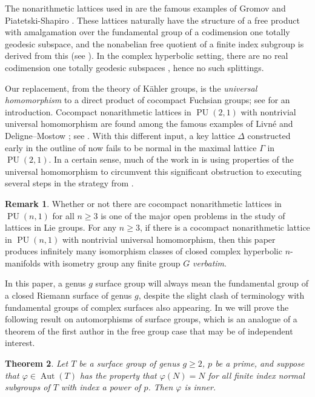 \documentclass[11pt]{article}
\theoremstyle{plain}
\newtheorem{thm}{Theorem}[section]
\theoremstyle{definition}
\newtheorem{rem}[thm]{Remark}
\theoremstyle{remark}
\newcommand{\Gam}{\Gamma}
\newcommand{\Del}{\Delta}
\DeclareMathOperator{\PU}{PU}
\DeclareMathOperator{\Aut}{Aut}
\begin{document}
The nonarithmetic lattices used in \cite{BelolipetskyLubotzky} are the famous examples of Gromov and Piatetski-Shapiro \cite{GPS}. These lattices naturally have the structure of a free product with amalgamation over the fundamental group of a codimension one totally geodesic subspace, and the nonabelian free quotient of a finite index subgroup is derived from this (see \cite{LubotzkyFreeQuo}). In the complex hyperbolic setting, there are no real codimension one totally geodesic subspaces \cite[\S 3.1]{Goldman}, hence no such splittings.

Our replacement, from the theory of K\"ahler groups, is the \emph{universal homomorphism} to a direct product of cocompact Fuchsian groups; see \cite{HLPSV} for an introduction. Cocompact nonarithmetic lattices in $\PU(2,1)$ with nontrivial universal homomorphism are found among the famous examples of Livn\'e \cite{Livne} and Deligne--Mostow \cite{DeligneMostow}; see . With this different input, a key lattice $\Del$ constructed early in the outline of \cite{BelolipetskyLubotzky} now fails to be normal in the maximal lattice $\Gam$ in $\PU(2,1)$. In a certain sense, much of the work in  is using properties of the universal homomorphism to circumvent this significant obstruction to executing several steps in the strategy from \cite{BelolipetskyLubotzky}.

\begin{rem}\label{rem:Highern}
Whether or not there are cocompact nonarithmetic lattices in $\PU(n,1)$ for all $n \ge 3$ is one of the major open problems in the study of lattices in Lie groups. For any $n \ge 3$, if there is a cocompact nonarithmetic lattice in $\PU(n,1)$ with nontrivial universal homomorphism, then this paper produces infinitely many isomorphism classes of closed complex hyperbolic $n$-manifolds with isometry group any finite group $G$ \emph{verbatim}.
\end{rem}

In this paper, a genus $g$ surface group will always mean the fundamental group of a closed Riemann surface of genus $g$, despite the slight clash of terminology with fundamental groups of complex surfaces also appearing. In  we will prove the following result on automorphisms of surface groups, which is an analogue of a theorem of the first author in the free group case \cite[Thm.\ 1]{LubotzkyFree} that may be of independent interest. 

\begin{thm}\label{thm:Fixpsubs}
Let $T$ be a surface group of genus $g \ge 2$, $p$ be a prime, and suppose that $\varphi \in \Aut(T)$ has the property that $\varphi(N) = N$ for all finite index normal subgroups of $T$ with index a power of $p$. Then $\varphi$ is inner.
\end{thm}
\end{document}
